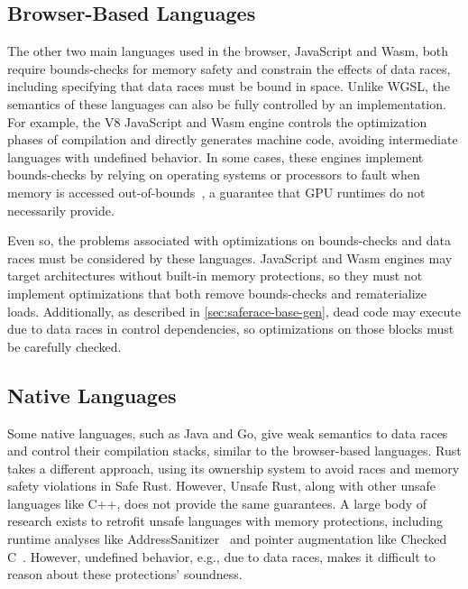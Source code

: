 \subsection{Browser-Based Languages}
The other two main languages used in the browser, JavaScript and Wasm, both require bounds-checks for memory safety and constrain the effects of data races, including specifying that data races must be bound in space. %
Unlike WGSL, the semantics of these languages can also be fully controlled by an implementation. For example, the V8 JavaScript and Wasm engine controls the optimization phases of compilation and directly generates machine code, avoiding intermediate languages with undefined behavior. In some cases, these engines implement bounds-checks by relying on operating systems or processors to fault when memory is accessed out-of-bounds~\cite{watt2019weakening}, a guarantee that GPU runtimes do not necessarily provide.

Even so, the problems associated with optimizations on bounds-checks and data races must be considered by these languages. JavaScript and Wasm engines may target architectures without built-in memory protections, so they must not implement optimizations that both remove bounds-checks and rematerialize loads. Additionally, as described in \mysec\ref{sec:saferace-base-gen}, dead code may execute due to data races in control dependencies, so optimizations on those blocks must be carefully checked. %

\subsection{Native Languages}

Some native languages, such as Java and Go, give weak semantics to data races and control their compilation stacks, similar to the browser-based languages. Rust takes a different approach, using its ownership system to avoid races and memory safety violations in Safe Rust. However, Unsafe Rust, along with other unsafe languages like C++, does not provide the same guarantees. A large body of research exists to retrofit unsafe languages with memory protections, including runtime analyses like AddressSanitizer~\cite{serbryany2012asan} and pointer augmentation like Checked C~\cite{ruef2019checkedc}. However, undefined behavior, e.g., due to data races, makes it difficult to reason about these protections' soundness.

